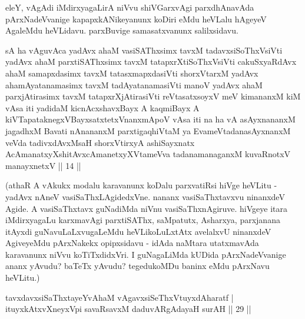 \begin{artha}
eleY, vAgAdi iMdirxyagaLirA niVvu shiVGarxvAgi parxdhAnavAda 
pArxNadeVvanige kapapxkANikeyanunx koDiri eMdu heVLalu hAgeyeV AgaleMdu 
heVLidavu. parxBuvige samasatxvanunx salilxsidavu.
\end{artha}

\begin{kandikeshl}
sA ha vAguvAca yadAvx ahaM vasiSAThxsimx tavxM tadavxsiSoThxV\s siVti yadAvx ahaM parxtiSAThxsimx tavxM tatapxrXtiSoThxV\s siVti cakuSxyaRdAvx ahaM samapxdasimx tavxM tatasxmapxdasiVti shorxVtarxM yadAvx ahamAyatanamasimx tavxM tadAyatanamasiVti manoV yadAvx ahaM parxjAtirasimx tavxM tatapxrXjAtirasiVti reVtasatxsoyxV meV kimananxM kiM vAsa iti yadidaM kicnAcxshavxBayx A kaqmiBayx A kiVTapataknegxVBayxsatxtetxV\s nanxmApoV vAsa iti na ha vA asAyxnananxM jagadhxM Bavati nAnananxM parxtigaqhiVtaM ya EvameVtadanasAyxnanxM veVda tadivxdAvxMsaH shorxVtirxyA ashiSayxnatx AcAmanatxyXshitAvxcAmanetxyXVtameVva tadanamanaganxM kuvaRnotxV manayxnetxV || 14 ||
\end{kandikeshl}

\begin{artha}
(athaR A vAkukx modalu karavanunx koDalu parxvatiRsi hiVge heVLitu - 
yadAvx nAneV vasiSaThxLAgidedxVne. nananx vasiSaThxtavxvu ninanxdeV 
Agide. A vasiSaThxtavx guNadiMda niVnu vasiSaThxnAgiruve. hiVgeye 
itara iMdirxyagaLu karxmavAgi parxtiSAThx, saMpatutx, Asharxya, 
parxjanana itAyxdi guNavuLaLxvugaLeMdu heVLikoLuLxtAtx avelalxvU 
ninanxdeV AgiveyeMdu pArxNakekx opipxsidavu - idAda naMtara utatxmavAda 
karavanunx niVvu koTiTxdidxVri. I guNagaLiMda kUDida pArxNadeVvanige 
ananx yAvudu? baTeTx yAvudu? tegedukoMDu baninx eMdu pArxNavu heVLitu.)
\end{artha}



\begin{shl}
tavxdavxsiSaThxtayeYvAhaM vAgavxsiSeThxVtuyxdAharatf | \\
ituyxkAtxvX\s neyxV\s pi savaRsavxM daduvARgAdayaH surAH \hfill|| 29 || 
\end{shl}

